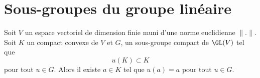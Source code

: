 \section{Sous-groupes du groupe linéaire}

\begin{lemma}       \label{LemOCtdiaE}
	Soit \( V\) un espace vectoriel de dimension finie muni d'une norme euclidienne \( \| . \|\). Soit \( K\) un compact convexe de \( V\) et \( G\), un sous-groupe compact de \( \GL(V)\) tel que
	\begin{equation}
		u(K)\subset K
	\end{equation}
	pour tout \( u\in G\). Alors il existe \( a\in K\) tel que \( u(a)=a\) pour tout \( u\in G\).
\end{lemma}

